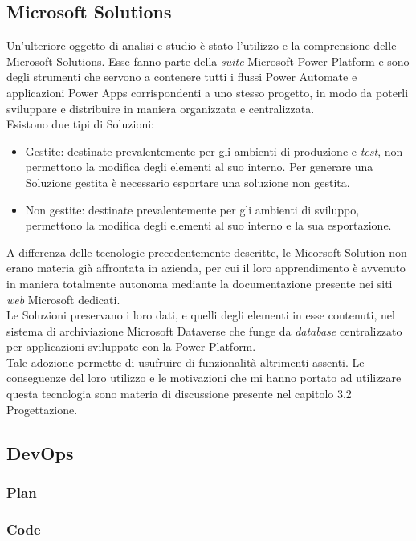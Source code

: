 \subsection{Microsoft Solutions}
Un'ulteriore oggetto di analisi e studio è stato l'utilizzo e la comprensione delle Microsoft Solutions. Esse fanno parte della \emph{suite} Microsoft Power Platform e sono degli strumenti che servono a contenere tutti i flussi Power Automate e applicazioni Power Apps corrispondenti a uno stesso progetto, in modo da poterli sviluppare e distribuire in maniera organizzata e centralizzata.\\
Esistono due tipi di Soluzioni: 
\begin{itemize}
    \item Gestite: destinate prevalentemente per gli ambienti di produzione e \emph{test}, non permettono la modifica degli elementi al suo interno. Per generare una Soluzione gestita è necessario esportare una soluzione non gestita.
    \item Non gestite: destinate prevalentemente per gli ambienti di sviluppo, permettono la modifica degli elementi al suo interno e la sua esportazione.
\end{itemize}
A differenza delle tecnologie precedentemente descritte, le Micorsoft Solution non erano materia già affrontata in azienda, per cui il loro apprendimento è avvenuto in maniera totalmente autonoma mediante la documentazione presente nei siti \emph{web} Microsoft dedicati.\\
Le Soluzioni preservano i loro dati, e quelli degli elementi in esse contenuti, nel sistema di archiviazione Microsoft Dataverse che funge da \emph{database} centralizzato per applicazioni sviluppate con la Power Platform.\\
Tale adozione permette di usufruire di funzionalità altrimenti assenti. Le conseguenze del loro utilizzo e le motivazioni che mi hanno portato ad utilizzare questa tecnologia sono materia di discussione presente nel capitolo 3.2 Progettazione.\\

\subsection{DevOps}

\subsubsection*{Plan}

\subsubsection*{Code}

